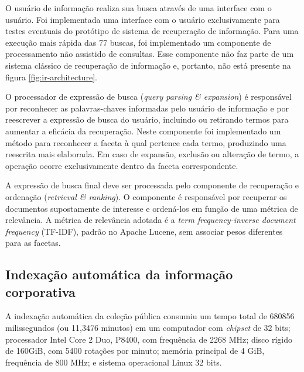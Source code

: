 O usuário de informação realiza sua busca através de uma interface com o usuário. Foi implementada uma interface com o usuário exclusivamente para testes eventuais do protótipo de sistema de recuperação de informação. Para uma execução mais rápida das 77 buscas, foi implementado um componente de processamento não assistido de consultas. Esse componente não faz parte de um sistema clássico de recuperação de informação e, portanto, não está presente na figura \ref{fig:ir-architecture}.

O processador de expressão de busca (\textit{query parsing \& expansion}) é responsável por reconhecer as palavras-chaves informadas pelo usuário de informação e por reescrever a expressão de busca do usuário, incluindo ou retirando termos para aumentar a eficácia da recuperação. Neste componente foi implementado um método para reconhecer a faceta à qual pertence cada termo, produzindo uma reescrita mais elaborada. Em caso de expansão, exclusão ou alteração de termo, a operação ocorre exclusivamente dentro da faceta correspondente.

A expressão de busca final deve ser processada pelo componente de recuperação e ordenação (\textit{retrieval \& ranking}). O componente é responsável por recuperar os documentos supostamente de interesse e ordená-los em função de uma métrica de relevância. A métrica de relevância adotada é a \textit{term frequency-inverse document frequency} (TF-IDF), padrão no Apache Lucene, sem associar pesos diferentes para as facetas.



\subsection{Indexação automática da informação corporativa}
\label{prototipo-indexacao}

A indexação automática da coleção pública consumiu um tempo total de 680856 milissegundos (ou 11,3476 minutos) em um computador com \textit{chipset} de 32 bits; processador Intel Core 2 Duo, P8400, com frequência de 2268 MHz; disco rígido de 160GiB, com 5400 rotações por minuto; memória principal de 4 GiB, frequência de 800 MHz; e sistema operacional Linux 32 bits.

